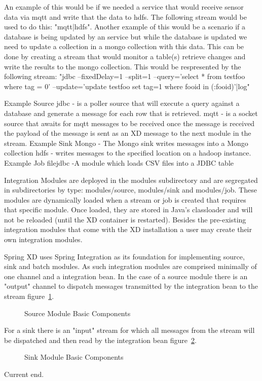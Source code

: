 An example of this would be if we needed a service that would receive sensor data via mqtt and write that the data to hdfs. The following stream would be used to do this: "mqtt|hdfs".
Another example of this would be a scenario if a database is being updated by an service but while the database is updated we need to update a collection in a mongo collection with this data.  This can be done by creating a stream that would monitor a table(s) retrieve changes and write the results to the mongo collection.  This would be respresented by the following stream: "jdbc --fixedDelay=1 --split=1 --query='select * from testfoo where tag = 0' --update='update testfoo set tag=1 where fooid in (:fooid)'|log" \par
Example Source
jdbc - is a poller source that will execute a query against a database and generate a message for each row that is retrieved.  \cite{jdbc-module}
mqtt - is a socket source that awaits for mqtt messages to be received once the message is received the payload of the message is sent as an XD message to the next module in the stream.  \cite{mqtt-module}
Example Sink
Mongo - The Mongo sink writes messages into a Mongo collection \cite{mongo-module}
hdfs - writes messages to the specified location on a hadoop instance. \cite{hadoop-hdfs-module}
Example Job
filejdbc -A module which loads CSV files into a JDBC table

Integration Modules are deployed in the modules subdirectory and are segregated in subdirectories by type: modules/source, modules/sink and modules/job.  
These modules are dynamically loaded when a stream or job is created that requires that specific module.  Once loaded, they are stored in Java's classloader and will not be reloaded (until the XD container is restarted).  Besides the pre-existing integration modules that come with the XD installation a user may create their own integration modules. \par

Spring XD uses Spring Integration \cite{spring-integration-reference} as its foundation for implementing source, sink and batch modules.  As such integration modules are comprised minimally of one channel and a integration bean.  In the case of a source module there is an "output" channel to dispatch messages transmitted by the integration bean to the stream figure~\ref{fig:sourcembc}. 
\begin{figure}[ht]
\centering
{}
\caption{Source Module Basic Components}
\label{fig:sourcembc}
\end{figure}

 For a sink there is an "input" stream for which all messages from the stream will be dispatched and then read by the integration bean figure~\ref{fig:sinkmbc}. 

\begin{figure}
\centering
{}
\caption{Sink Module Basic Components}
\label{fig:sinkmbc}
\end{figure}

Current end. \par